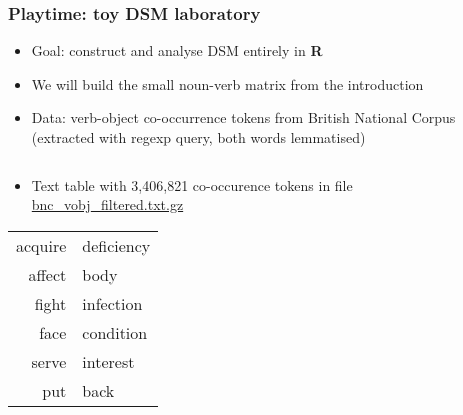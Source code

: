 \begin{frame}
  \frametitle{Playtime: toy DSM laboratory}

  \begin{itemize}
  \item Goal: construct and analyse DSM entirely in \textbf{R}
  \item We will build the small noun-verb matrix from the introduction
  \item Data: verb-object co-occurrence tokens from British National Corpus
    (extracted with regexp query, both words lemmatised)
  \end{itemize}
  \begin{columns}[T]
    \begin{column}{60mm}
      \begin{itemize}
      \item Text table with 3,406,821 co-occurence tokens in file
        {\url{bnc_vobj_filtered.txt.gz}}
      \end{itemize}
      \begin{center}\ungap[.5]
        \begin{tabular}{rl}
          acquire & deficiency \\
          affect & body \\
          fight & infection \\
          face & condition \\
          serve & interest \\
          put & back
        \end{tabular}
      \end{center}
    \end{column}
    \begin{column}{40mm}
      \vspace{12mm}
    \end{column}
  \end{columns}
\end{frame}

